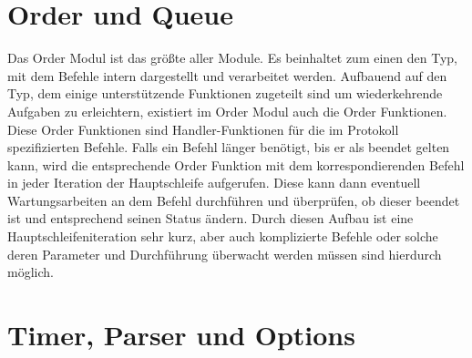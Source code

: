 \section{Order und Queue}
Das Order Modul ist das größte aller Module. Es beinhaltet zum einen den Typ, mit dem Befehle
intern dargestellt und verarbeitet werden. Aufbauend auf den Typ, dem einige unterstützende
Funktionen zugeteilt sind um wiederkehrende Aufgaben zu erleichtern, existiert im Order
Modul auch die Order Funktionen. Diese Order Funktionen sind Handler-Funktionen für die
im Protokoll spezifizierten Befehle. Falls ein Befehl länger benötigt, bis er als beendet
gelten kann, wird die entsprechende Order Funktion mit dem korrespondierenden Befehl in jeder
Iteration der Hauptschleife aufgerufen. Diese kann dann eventuell Wartungsarbeiten an dem
Befehl durchführen und überprüfen, ob dieser beendet ist und entsprechend seinen Status ändern.
Durch diesen Aufbau ist eine Hauptschleifeniteration sehr kurz, aber auch komplizierte Befehle
oder solche deren Parameter und Durchführung überwacht werden müssen sind hierdurch möglich.
\section{Timer, Parser und Options}
